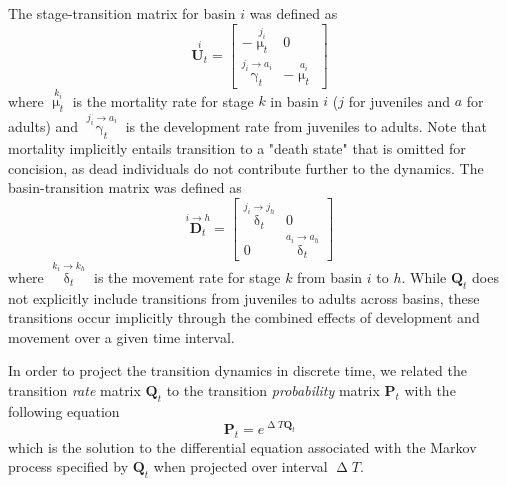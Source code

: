 The stage-transition matrix for basin $i$ was defined as
%
\begin{equation} \label{eq:U}
\overset{i}{\mathbf{U}_t} = 
\left[
\begin{array}{cccc}
    -\overset{j_i}{\upmu_t} & 0 \\
    \overset{j_i\rightarrow a_i}{\upgamma_t} & -\overset{a_i}{\upmu_t}
    \end{array}
\right]
\end{equation}
%
where $\overset{k_i}{\upmu_t}$ is the mortality rate for stage $k$ in basin $i$
($j$ for juveniles and $a$ for adults)
and $\overset{j_i\rightarrow a_i}{\upgamma_t}$ 
is the development rate from juveniles to adults.
Note that mortality implicitly entails transition to a "death state" that is omitted 
for concision, as dead individuals do not contribute further to the dynamics. 
The basin-transition matrix was defined as
%
\begin{equation} \label{eq:D}
\overset{i\rightarrow h}{\mathbf{D}_t} = 
\left[
\begin{array}{cccc}
    \overset{j_{i}\rightarrow j_{h}}{\updelta_t} & 0 \\
    0 & \overset{a_{i}\rightarrow a_{h}}{\updelta_t}
    \end{array}
\right]
\end{equation}
where $\overset{k_{i}\rightarrow k_{h}}{\updelta_t}$ is the movement rate for stage $k$ 
from basin $i$ to $h$. 
While $\mathbf{Q}_t$ does not explicitly include transitions from juveniles to adults 
across basins, these transitions occur implicitly through the combined effects of
development and movement over a given time interval.

In order to project the transition dynamics in discrete time, 
we related the transition \emph{rate} matrix $\mathbf{Q}_t$ 
to the transition \emph{probability} matrix $\mathbf{P}_t$ 
with the following equation
%
\begin{equation} \label{eq:P}
\mathbf{P}_t = e^{ \upDelta T \mathbf{Q}_t}
\end{equation}
%
which is the solution to the differential equation associated with the Markov process
specified by $\mathbf{Q}_t$ when projected over interval $\upDelta T$.

